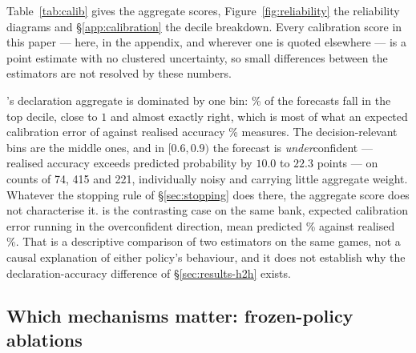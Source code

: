\begin{table}[!htbp]
\centering
\caption{Aggregate forecast reliability (E6). Population: the calibration bank of
\numCalibDeals{} deals, seed $717171$, \vfast{} against \vthree{}, both frozen;
the unit is one forecast and $n$ counts forecasts of that type. \vthree{} exposes
no ask forecast, so only the declaration rows are comparable. All entries are
point estimates: no clustered uncertainty for Brier score, log loss or ECE.
Voluntary and forced declarations are pooled here, unlike in
Table~\ref{tab:h2h}.}
\label{tab:calib}
\small

\end{table}

Table~\ref{tab:calib} gives the aggregate scores, Figure~\ref{fig:reliability}
the reliability diagrams and \S\ref{app:calibration} the decile breakdown. Every
calibration score in this paper --- here, in the appendix, and wherever one is
quoted elsewhere --- is a point estimate with no clustered uncertainty, so small
differences between the estimators are not resolved by these numbers.

\vfast{}'s declaration aggregate is dominated by one bin: \numDeclTopBinShare\% of
the \numDeclN{} forecasts fall in the top decile, close to $1$ and almost exactly
right, which is most of what an expected calibration error of \numDeclECE{}
against realised accuracy \numDeclObs\% measures. The decision-relevant bins are
the middle ones, and in $[0.6, 0.9)$ the forecast is \emph{under}confident ---
realised accuracy exceeds predicted probability by $10.0$ to $22.3$ points --- on counts
of 74, 415 and 221, individually noisy and carrying little aggregate weight.
Whatever the stopping rule of \S\ref{sec:stopping} does there, the aggregate
score does not characterise it. \vthree{} is the contrasting case on the same
bank, expected calibration error \numVthreeDeclECE{} running in the overconfident
direction, mean predicted \numVthreeDeclPred\% against realised
\numVthreeDeclObs\%. That is a descriptive comparison of two estimators on the
same games, not a causal explanation of either policy's behaviour, and it does
not establish why the declaration-accuracy difference of \S\ref{sec:results-h2h}
exists.

\subsection{Which mechanisms matter: frozen-policy ablations}
\label{sec:ablations}

